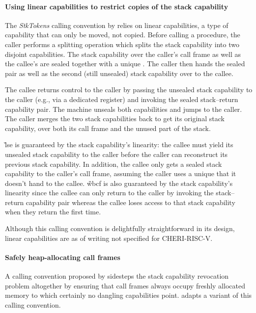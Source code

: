 \documentclass[main.tex]{subfiles}
\begin{document}
\paragraph{Using linear capabilities to restrict copies of the stack capability} The \emph{StkTokens} calling convention by \cite{stktokens} relies on linear capabilities, a type of capability that can only be moved, not copied. Before calling a procedure, the caller performs a splitting operation which splits the stack capability into two disjoint capabilities. The stack capability over the caller's call frame as well as the callee's  are sealed together with a unique . The caller then hands the sealed pair as well as the second (still unsealed) stack capability over to the callee.

The callee returns control to the caller by passing the unsealed stack capability to the caller (e.g., via a dedicated register) and invoking the sealed stack–return capability pair. The machine unseals both capabilities and jumps to the caller. The caller merges the two stack capabilities back to get its original stack capability, over both its call frame and the unused part of the stack.

\G{lse} is guaranteed by the stack capability's linearity: the callee must yield its unsealed stack capability to the caller before the caller can reconstruct its previous stack capability. In addition, the callee only gets a sealed stack capability to the caller's call frame, assuming the caller uses a unique  that it doesn't hand to the callee. \G{wbcf} is also guaranteed by the stack capability's linearity since the callee can only return to the caller by invoking the stack–return capability pair whereas the callee loses access to that stack capability when they return the first time. 

Although this calling convention is delightfully straightforward in its design, linear capabilities are as of writing not specified for CHERI-RISC-V.

\paragraph{Safely heap-allocating call frames} A calling convention proposed by \cite[section~7.3]{cerise} sidesteps the stack capability revocation problem altogether by ensuring that call frames always occupy freshly allocated memory to which certainly no dangling capabilities point.  adapts a variant of this calling convention.
\end{document}
